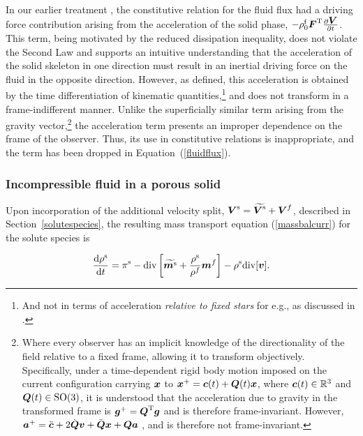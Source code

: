 In our earlier treatment \citep{growthpaper}, the constitutive
relation for the fluid flux had a driving force contribution arising
from the acceleration of the solid phase,
$-\rho_0^\mathrm{f}\mbox{\boldmath$ F$}^{\mathrm{T}}\frac{\partial \mbox{\boldmath$ V$}}{\partial t}$.
This term, being motivated by the reduced dissipation inequality, does
not violate the Second Law and supports an intuitive understanding
that the acceleration of the solid skeleton in one direction must result in
an inertial driving force on the fluid in the opposite
direction. However, as defined, this acceleration is obtained by the
time differentiation of kinematic quantities,\footnote{And not in terms
of acceleration {\em relative to fixed stars} for e.g., as discussed
in \cite[][Page 43]{TruesdellNoll:65}.} and does not transform in a
frame-indifferent manner. Unlike the superficially similar term
arising from the gravity vector,\footnote{Where every observer has an
implicit knowledge of the directionality of the field relative to a
fixed frame, allowing it to transform objectively. Specifically, under
a time-dependent rigid body motion imposed on the current
configuration carrying $\mbox{\boldmath$ x$}$ to $\mbox{\boldmath$ x$}^+ = \mbox{\boldmath$ c$}(t) + \mbox{\boldmath$ Q$}(t)\mbox{\boldmath$ x$}$, where
$\mbox{\boldmath$ c$}(t) \in \mathbb{R}^3$ and $\mbox{\boldmath$ Q$}(t) \in \mbox{SO}(3)$, it is
understood that the acceleration due to gravity in the transformed
frame is $\mbox{\boldmath$ g$}^+ = \mbox{\boldmath$ Q$}^\mathrm{T}\mbox{\boldmath$ g$}$ and is therefore
frame-invariant. However, $\mbox{\boldmath$ a$}^+ = \ddot{\mbox{\boldmath$ c$}} + 2\dot{\mbox{\boldmath$ Q$}}\mbox{\boldmath$ v$} +
\ddot{\mbox{\boldmath$ Q$}}\mbox{\boldmath$ x$} + \mbox{\boldmath$ Q$}\mbox{\boldmath$ a$}$ , and is therefore not frame-invariant.} the
acceleration 
term presents an improper dependence on the frame of the
observer. Thus, its use in constitutive relations is inappropriate,
and the term has been dropped in \mbox{Equation (\ref{fluidflux})}.

\subsubsection{Incompressible fluid in a porous solid}
\label{incompfluid}

Upon incorporation of the additional velocity split,
$\mbox{\boldmath$ V$}^\mathrm{s}=\widetilde{\mbox{\boldmath$ V$}^\mathrm{s}}+\mbox{\boldmath$ V$}^f$, described in
Section~\ref{solutespecies}, the resulting mass transport equation
(\ref{massbalcurr}) for the solute species is

\begin{equation}
\frac{\mathrm{d}\rho^\mathrm{s}}{\mathrm{d}t} = \pi^\mathrm{s}-
\mathrm{div} \left[\widetilde{\mbox{\boldmath$ m$}^\mathrm{s}}+
\frac{\rho^\mathrm{s}}{\rho^f}\mbox{\boldmath$ m$}^f\right] - \rho^\mathrm{s}
\mathrm{div}[\mbox{\boldmath$ v$}].
\label{massbalcurrsol}
\end{equation}

